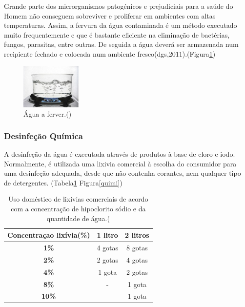 \documentclass{report}
\begin{document}
Grande parte dos microrganismos patogénicos e prejudiciais para a saúde do Homem não conseguem sobreviver e proliferar em ambientes com altas temperaturas. Assim, a fervura da água contaminada é um método executado muito frequentemente e que é bastante eficiente na eliminação de bactérias, fungos, parasitas, entre outras. De seguida a água deverá ser armazenada num recipiente fechado e colocada num ambiente fresco(\ac{dgs},2011).(Figura\ref{agua})

\begin{figure}[H]
\center
\includegraphics[width=3cm]{agua.jpg}
\caption{Água a ferver.(\cite{figagua})}
\label{agua}
\end{figure}

\subsubsection{Desinfeção Química}
\cite{dgsriscos}

A desinfeção da água é executada através de produtos à base de cloro e iodo. Normalmente, é utilizada uma lixivia comercial à escolha do consumidor para uma desinfeção adequada, desde que não contenha corantes, nem qualquer tipo de detergentes. (Tabela\ref{tab1}  Figura\ref{quimi})

\begin{table}
\centering
\caption{Uso doméstico de lixivias comerciais de acordo com a concentração de hipoclorito sódio e da quantidade de água.(}
\begin{tabular}{|c||c||c|}
\hline
\textbf{Concentraçao lixívia(\%)}     &  \textbf{1 litro}  &  \textbf{2 litros}  \\ \hline
	\textbf{1\%}		      &  4 gotas	   &  8 gotas   \\ \hline
	\textbf{2\%}		      &	 2 gotas	   &  4 gotas   \\ \hline
	\textbf{4\%}		      &  1 gota	       &  2 gotas   \\ \hline
	\textbf{8\%}		      &     -    	   &  1 gota    \\ \hline
	\textbf{10\%}		      &     -    	   &  1 gota    \\ \hline
\end{tabular}
\label{tab1}
\end{table}
\end{document}
